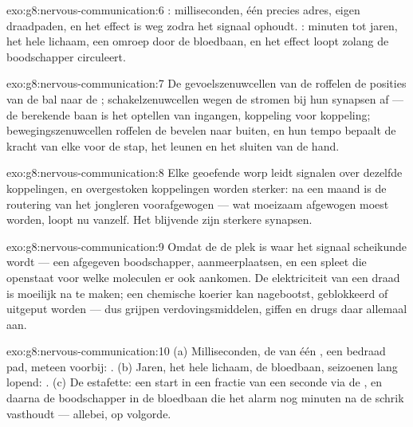 \begin{solution}{exo:g8:nervous-communication:6}
: milliseconden, één precies adres, eigen draadpaden, en het effect
is weg zodra het signaal ophoudt. : minuten tot jaren, het hele
lichaam, een omroep door de bloedbaan, en het effect loopt zolang de
boodschapper circuleert.
\end{solution}

\begin{solution}{exo:g8:nervous-communication:7}
De gevoelszenuwcellen van de  roffelen de posities van de bal naar de
; schakelzenuwcellen wegen de stromen bij hun synapsen af --- de
berekende baan is het optellen van ingangen, koppeling voor koppeling;
bewegingszenuwcellen roffelen de bevelen naar buiten, en hun tempo bepaalt
de kracht van elke  voor de stap, het leunen en het sluiten van de
hand.
\end{solution}

\begin{solution}{exo:g8:nervous-communication:8}
Elke geoefende worp leidt signalen over dezelfde koppelingen, en
overgestoken koppelingen worden sterker: na een maand is de routering van
het jongleren voorafgewogen --- wat moeizaam afgewogen moest worden, loopt
nu vanzelf. Het blijvende zijn sterkere synapsen.
\end{solution}

\begin{solution}{exo:g8:nervous-communication:9}
Omdat de  de plek is waar het signaal scheikunde wordt --- een
afgegeven boodschapper, aanmeerplaatsen, en een spleet die openstaat voor
welke moleculen er ook aankomen. De elektriciteit van een draad is moeilijk
na te maken; een chemische koerier kan nagebootst, geblokkeerd of uitgeput
worden --- dus grijpen verdovingsmiddelen, giffen en drugs daar allemaal aan.
\end{solution}

\begin{solution}{exo:g8:nervous-communication:10}
(a) Milliseconden, de  van één , een bedraad pad, meteen
voorbij: . (b) Jaren, het hele lichaam, de bloedbaan, seizoenen
lang lopend: . (c) De estafette: een start in een fractie van een
seconde via de , en daarna de boodschapper in de bloedbaan die het
alarm nog minuten na de schrik vasthoudt --- allebei, op volgorde.
\end{solution}

